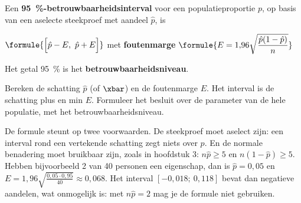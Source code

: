 \begin{theorie}
Een \textbf{\textcolor{accent}{95~\%-betrouwbaarheidsinterval}} voor een populatieproportie $p$, op basis van een aselecte steekproef met aandeel $\hat{p}$, is

\vspace{1mm}
\qquad $\formule{\Bigl[\hat{p} - E,\ \hat{p} + E\Bigr]}$ \quad met \textbf{\textcolor{accent}{foutenmarge}} \quad $\formule{E = 1{,}96 \sqrt{\dfrac{\hat{p}(1 - \hat{p})}{n}}}$

\vspace{1mm}
Het getal 95~\% is het \textbf{\textcolor{accent}{betrouwbaarheidsniveau}}.
\end{theorie}


\begin{werkwijze}
Bereken de schatting $\hat{p}$ (of $\xbar$) en de foutenmarge $E$. Het interval is de schatting plus en min $E$. Formuleer het besluit over de parameter van de hele populatie, met het betrouwbaarheidsniveau.
\end{werkwijze}

\begin{oefeningen}
\end{oefeningen}

De formule steunt op twee voorwaarden. De steekproef moet aselect zijn: een interval rond een vertekende schatting zegt niets over $p$. En de normale benadering moet bruikbaar zijn, zoals in hoofdstuk 3: $n\hat{p} \geqslant 5$ en $n(1 - \hat{p}) \geqslant 5$. Hebben bijvoorbeeld 2 van 40 personen een eigenschap, dan is $\hat{p} = 0{,}05$ en $E = 1{,}96\sqrt{\frac{0{,}05 \cdot 0{,}95}{40}} \approx 0{,}068$. Het interval $[-0{,}018;\ 0{,}118]$ bevat dan negatieve aandelen, wat onmogelijk is: met $n\hat{p} = 2$ mag je de formule niet gebruiken.

